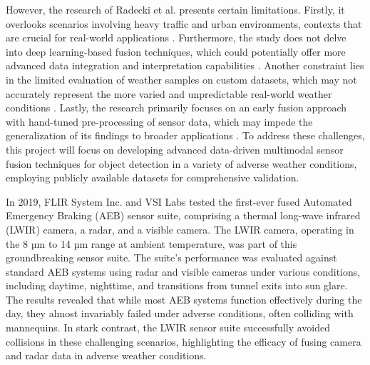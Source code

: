 \documentclass[report.tex]{subfiles}
\begin{document}

    However, the research of Radecki et al. \cite{radecki2016all} presents certain limitations. Firstly, it overlooks scenarios involving heavy traffic and urban environments, contexts that are crucial for real-world applications \cite{cai2020probabilistic}. Furthermore, the study does not delve into deep learning-based fusion techniques, which could potentially offer more advanced data integration and interpretation capabilities \cite{diaby2021evidential}. Another constraint lies in the limited evaluation of weather samples on custom datasets, which may not accurately represent the more varied and unpredictable real-world weather conditions \cite{galvao2021pedestrian}. Lastly, the research primarily focuses on an early fusion approach with hand-tuned pre-processing of sensor data, which may impede the generalization of its findings to broader applications \cite{rizzoli2022multimodal}. To address these challenges, this project will focus on developing advanced data-driven multimodal sensor fusion techniques for object detection in a variety of adverse weather conditions, employing publicly available datasets for comprehensive validation.

    In 2019, FLIR System Inc. \cite{fused_aeb} and VSI Labs \cite{VSILabs} tested the first-ever fused Automated Emergency Braking (AEB) sensor suite, comprising a thermal long-wave infrared (LWIR) camera, a radar, and a visible camera. The LWIR camera, operating in the 8 µm to 14 µm range at ambient temperature, was part of this groundbreaking sensor suite. The suite's performance was evaluated against standard AEB systems using radar and visible cameras under various conditions, including daytime, nighttime, and transitions from tunnel exits into sun glare. The results revealed that while most AEB systems function effectively during the day, they almost invariably failed under adverse conditions, often colliding with mannequins. In stark contrast, the LWIR sensor suite successfully avoided collisions in these challenging scenarios, highlighting the efficacy of fusing camera and radar data in adverse weather conditions.
\end{document}
